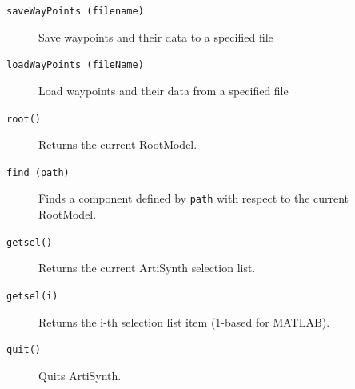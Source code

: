 \documentclass{article}
\begin{document}
\begin{description}
\item[{\tt saveWayPoints (filename)}] \mbox{}

Save waypoints and their data to a specified file

\item[{\tt loadWayPoints (fileName)}] \mbox{}

Load waypoints and their data from a specified file

\item[{\tt root()}] \mbox{}

Returns the current RootModel.

\item[{\tt find (path)}] \mbox{}

Finds a component defined by {\tt path} with respect to the current RootModel.

\item[{\tt getsel()}] \mbox{}

Returns the current ArtiSynth selection list.

\item[{\tt getsel(i)}] \mbox{}

Returns the i-th selection list item (1-based for MATLAB).

\item[{\tt quit()}] \mbox{}

Quits ArtiSynth.

\end{description}
\end{document}
